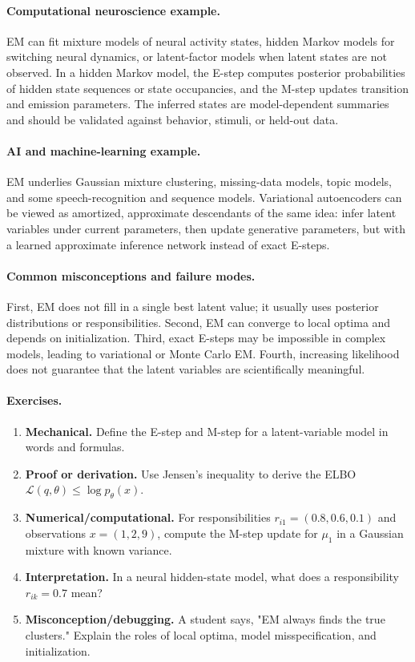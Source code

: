 \paragraph{Computational neuroscience example.}
EM can fit mixture models of neural activity states, hidden Markov models for switching neural dynamics, or latent-factor models when latent states are not observed. In a hidden Markov model, the E-step computes posterior probabilities of hidden state sequences or state occupancies, and the M-step updates transition and emission parameters. The inferred states are model-dependent summaries and should be validated against behavior, stimuli, or held-out data.

\paragraph{AI and machine-learning example.}
EM underlies Gaussian mixture clustering, missing-data models, topic models, and some speech-recognition and sequence models. Variational autoencoders can be viewed as amortized, approximate descendants of the same idea: infer latent variables under current parameters, then update generative parameters, but with a learned approximate inference network instead of exact E-steps.

\paragraph{Common misconceptions and failure modes.}
First, EM does not fill in a single best latent value; it usually uses posterior distributions or responsibilities. Second, EM can converge to local optima and depends on initialization. Third, exact E-steps may be impossible in complex models, leading to variational or Monte Carlo EM. Fourth, increasing likelihood does not guarantee that the latent variables are scientifically meaningful.

\paragraph{Exercises.}
\begin{enumerate}[label=\textbf{34.3.\arabic*.}, leftmargin=*]
\item \textbf{Mechanical.} Define the E-step and M-step for a latent-variable model in words and formulas.
\item \textbf{Proof or derivation.} Use Jensen's inequality to derive the ELBO \(\mathcal L(q,\theta)\leq\log p_\theta(x)\).
\item \textbf{Numerical/computational.} For responsibilities \(r_{i1}=(0.8,0.6,0.1)\) and observations \(x=(1,2,9)\), compute the M-step update for \(\mu_1\) in a Gaussian mixture with known variance.
\item \textbf{Interpretation.} In a neural hidden-state model, what does a responsibility \(r_{ik}=0.7\) mean?
\item \textbf{Misconception/debugging.} A student says, "EM always finds the true clusters." Explain the roles of local optima, model misspecification, and initialization.
\end{enumerate}

